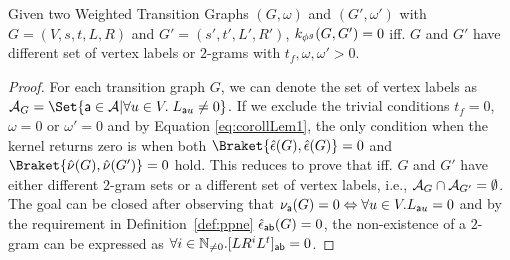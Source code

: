 \begin{lemma}\label{lem:sdiss}
	Given two Weighted Transition Graphs $(G,\omega)$ and $(G',\omega')$ with $G=(V,s,t,L,R)$ and $G'=(s',t',L',R')$, $k_{{\phi^{g}}}(G,G')=0$ iff. $G$ and $G'$ have different set of vertex labels or $2$-grams with $t_f,\omega,\omega'>0$.
\end{lemma}
\begin{proof}
{For each transition graph $G$, we can denote the set of vertex labels as $\tasks_G=\Set{\const{a}\in\tasks|\forall u\in V.\; L_{\const{a}u}\neq 0}$.} If we exclude the trivial conditions $t_f=0$, $\omega=0$ or $\omega'=0$ and by Equation \ref{eq:corollLem1}, the only condition when the kernel returns zero is when both $\Braket{\hat{\epsilon}(G),\hat{\epsilon}(G)}=0$ and $\Braket{\hat{\nu}(G),\hat{\nu}(G')}=0$ hold. {This reduces to prove that  iff. $G$ and $G'$ have either different $2$-gram sets or a different set of vertex labels, i.e., $\mathcal{A}_G\cap \mathcal{A}_{G'}=\emptyset$.} {The goal can be closed after observing that $\nu_{\mathsf{a}}(G)=0\Leftrightarrow \forall u\in V. L_{\mathsf{a}u}=0$ and by the requirement in Definition~\ref{def:ppne} $\hat{\epsilon}_{\mathsf{ab}}(G)=0$, the non-existence of a  $2$-gram can be expressed as $\forall i\in\mathbb{N}_{\neq0}. [LR^iL^t]_{\mathsf{ab}}=0$.}
	

\end{proof}
